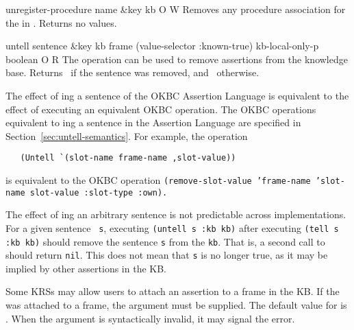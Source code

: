 \begin{okbcop}{unregister-procedure}{ name \&key kb} { \void } { O } { W } {  }
Removes any procedure association for the  in .
   Returns no values.
\end{okbcop}

\begin{okbcop}{untell}{ sentence \&key kb frame (value-selector :known-true) kb-local-only-p} { boolean } { O } { R } {  }
The  operation can be used to remove assertions from the
   knowledge base.  Returns \true\ if the sentence was removed, and 
   \false\ otherwise.

   The effect of ing a sentence of the OKBC Assertion Language
   is equivalent to the effect of executing an equivalent OKBC operation.  
   The OKBC operations equivalent to ing a sentence in the
   Assertion Language are specified in Section~\ref{sec:untell-semantics}.
   For example, the operation
   \begin{verbatim}
   (Untell `(slot-name frame-name ,slot-value))
   \end{verbatim}
   is equivalent to the OKBC operation {\tt (remove-slot-value 'frame-name
   'slot-name slot-value :slot-type :own).}

   The effect of ing an arbitrary  sentence
   is not predictable across implementations.  For a given sentence {\tt
   s}, executing {\tt (untell s :kb kb)} after executing {\tt (tell s :kb
   kb)} should remove the sentence {\tt s} from the {\tt kb}.  That is, a
   second call to  should return {\tt nil}.  This
   does not mean that {\tt s} is no longer true, as it may be implied by
   other assertions in the KB.

   Some KRSs may allow users to attach an assertion to a frame in the KB.
   If the  was attached to a frame, the 
   argument must be supplied.  The default value for  is
   \false.  When the  argument is syntactically invalid, it
   may signal the  error.
\end{okbcop}

